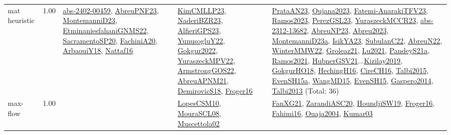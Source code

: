 {\begin{longtable}{p{3cm}r>{\raggedright\arraybackslash}p{6cm}>{\raggedright\arraybackslash}p{6cm}>{\raggedright\arraybackslash}p{8cm}}
\index{mat heuristic}\index{Algorithms!mat heuristic}mat heuristic &  1.00 & \hyperref[detail:abs-2402-00459]{abs-2402-00459}, \hyperref[detail:AbreuPNF23]{AbreuPNF23}, \hyperref[detail:MontemanniD23]{MontemanniD23}, \hyperref[detail:EtminaniesfahaniGNMS22]{EtminaniesfahaniGNMS22}, \hyperref[detail:SacramentoSP20]{SacramentoSP20}, \hyperref[detail:FachiniA20]{FachiniA20}, \hyperref[detail:ArbaouiY18]{ArbaouiY18}, \hyperref[detail:Nattaf16]{Nattaf16} & \hyperref[detail:KimCMLLP23]{KimCMLLP23}, \hyperref[detail:NaderiBZR23]{NaderiBZR23}, \hyperref[detail:AlfieriGPS23]{AlfieriGPS23}, \hyperref[detail:YunusogluY22]{YunusogluY22}, \hyperref[detail:Gokgur2022]{Gokgur2022}, \hyperref[detail:YuraszeckMPV22]{YuraszeckMPV22}, \hyperref[detail:ArmstrongGOS22]{ArmstrongGOS22}, \hyperref[detail:AbreuAPNM21]{AbreuAPNM21}, \hyperref[detail:DemirovicS18]{DemirovicS18}, \hyperref[detail:Froger16]{Froger16} & \hyperref[detail:PrataAN23]{PrataAN23}, \hyperref[detail:Oujana2023]{Oujana2023}, \hyperref[detail:Fatemi-AnarakiTFV23]{Fatemi-AnarakiTFV23}, \hyperref[detail:Ramos2023]{Ramos2023}, \hyperref[detail:PerezGSL23]{PerezGSL23}, \hyperref[detail:YuraszeckMCCR23]{YuraszeckMCCR23}, \hyperref[detail:abs-2312-13682]{abs-2312-13682}, \hyperref[detail:AbreuNP23]{AbreuNP23}, \hyperref[detail:Abreu2023]{Abreu2023}, \hyperref[detail:MontemanniD23a]{MontemanniD23a}, \hyperref[detail:IsikYA23]{IsikYA23}, \hyperref[detail:SubulanC22]{SubulanC22}, \hyperref[detail:AbreuN22]{AbreuN22}, \hyperref[detail:WinterMMW22]{WinterMMW22}, \hyperref[detail:Groleaz21]{Groleaz21}, \hyperref[detail:Lu2021]{Lu2021}, \hyperref[detail:PandeyS21a]{PandeyS21a}, \hyperref[detail:Ramos2021]{Ramos2021}, \hyperref[detail:HubnerGSV21]{HubnerGSV21}...\hyperref[detail:Kizilay2019]{Kizilay2019}, \hyperref[detail:GokgurHO18]{GokgurHO18}, \hyperref[detail:HechingH16]{HechingH16}, \hyperref[detail:CireCH16]{CireCH16}, \hyperref[detail:Talbi2015]{Talbi2015}, \hyperref[detail:EvenSH15a]{EvenSH15a}, \hyperref[detail:WangMD15]{WangMD15}, \hyperref[detail:EvenSH15]{EvenSH15}, \hyperref[detail:Gaspero2014]{Gaspero2014}, \hyperref[detail:Talbi2013]{Talbi2013} (Total: 36)\\
\index{max-flow}\index{Algorithms!max-flow}max-flow &  1.00 &  & \hyperref[detail:LopesCSM10]{LopesCSM10}, \hyperref[detail:MouraSCL08]{MouraSCL08}, \hyperref[detail:Muscettola02]{Muscettola02} & \hyperref[detail:FanXG21]{FanXG21}, \hyperref[detail:ZarandiASC20]{ZarandiASC20}, \hyperref[detail:HoundjiSW19]{HoundjiSW19}, \hyperref[detail:Froger16]{Froger16}, \hyperref[detail:Fahimi16]{Fahimi16}, \hyperref[detail:Ouaja2004]{Ouaja2004}, \hyperref[detail:Kumar03]{Kumar03}\\

\end{longtable}}
